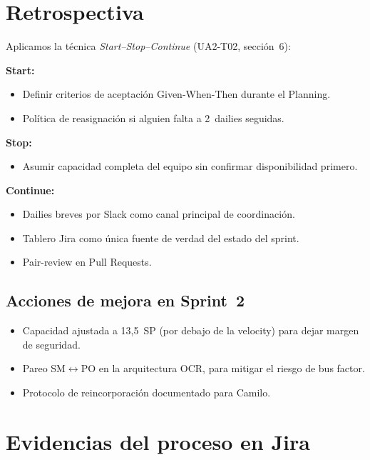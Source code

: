 \documentclass[11pt,a4paper]{article}
\begin{document}
\section{Retrospectiva}

Aplicamos la técnica \emph{Start--Stop--Continue} (UA2-T02, sección~6):

\textbf{Start:}
\begin{itemize}
\item Definir criterios de aceptación Given-When-Then durante el Planning.
\item Política de reasignación si alguien falta a 2~dailies seguidas.
\end{itemize}

\textbf{Stop:}
\begin{itemize}
\item Asumir capacidad completa del equipo sin confirmar disponibilidad primero.
\end{itemize}

\textbf{Continue:}
\begin{itemize}
\item Dailies breves por Slack como canal principal de coordinación.
\item Tablero Jira como única fuente de verdad del estado del sprint.
\item Pair-review en Pull Requests.
\end{itemize}

\subsection{Acciones de mejora en Sprint~2}

\begin{itemize}
\item Capacidad ajustada a 13,5~SP (por debajo de la velocity) para
  dejar margen de seguridad.
\item Pareo SM$\leftrightarrow$PO en la arquitectura OCR, para mitigar
  el riesgo de bus factor.
\item Protocolo de reincorporación documentado para Camilo.
\end{itemize}

\section{Evidencias del proceso en Jira}
\end{document}
